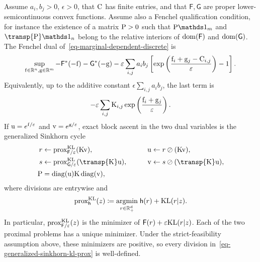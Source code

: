 \begin{prop}\label{prop-marginal-dependent-dual-scaling}
Assume $a_i,b_j>0$, $\epsilon>0$, that $\C$ has finite entries, and that $\mathsf F,\mathsf G$ are proper lower-semicontinuous convex functions. Assume also a Fenchel qualification condition, for instance the existence of a matrix $\P>0$ such that $\P\ones_m$ and $\transp{\P}\ones_n$ belong to the relative interiors of $\dom(\mathsf F)$ and $\dom(\mathsf G)$. The Fenchel dual of~\eqref{eq-marginal-dependent-discrete} is
\begin{equation}\label{eq-marginal-dependent-dual}
	\sup_{\fD\in\RR^n,\gD\in\RR^m}
	-
	\mathsf F^*(-\fD)
	-
	\mathsf G^*(-\gD)
	-
	\epsilon\sum_{i,j}a_i b_j
	\left[
		\exp\left(\frac{\fD_i+\gD_j-\C_{i,j}}{\epsilon}\right)-1
	\right].
\end{equation}
Equivalently, up to the additive constant $\epsilon\sum_{i,j}a_i b_j$, the last term is
\[
	-
	\epsilon\sum_{i,j}\K_{i,j}
	\exp\left(\frac{\fD_i+\gD_j}{\epsilon}\right).
\]
If $\uD=e^{\fD/\epsilon}$ and $\vD=e^{\gD/\epsilon}$, exact block ascent in the two dual variables is the generalized Sinkhorn cycle
\begin{equation}\label{eq-generalized-sinkhorn-kl-prox}
\begin{aligned}
	r &\leftarrow \prox_{\mathsf F/\epsilon}^{\KLD}(\K\vD),
	&\qquad
	\uD &\leftarrow r\oslash(\K\vD),\\
	s &\leftarrow \prox_{\mathsf G/\epsilon}^{\KLD}(\transp{\K}\uD),
	&\qquad
	\vD &\leftarrow s\oslash(\transp{\K}\uD),\\
	\P&=\diag(\uD)\K\diag(\vD),
\end{aligned}
\end{equation}
where divisions are entrywise and
\begin{equation}\label{eq-kl-prox-marginal}
	\prox_{\mathsf h}^{\KLD}(z)
	\eqdef
	\uargmin{r\in\RR_+^d}
	\mathsf h(r)+\KLD(r|z).
\end{equation}
In particular, $\prox_{\mathsf F/\epsilon}^{\KLD}(z)$ is the minimizer of $\mathsf F(r)+\epsilon\KLD(r|z)$. Each of the two proximal problems has a unique minimizer. Under the strict-feasibility assumption above, these minimizers are positive, so every division in~\eqref{eq-generalized-sinkhorn-kl-prox} is well-defined.
\end{prop}

